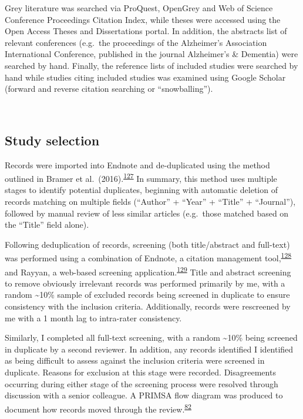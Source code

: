 \documentclass[a4paper, twoside]{templates/ociamthesis}
\begin{document}
Grey literature was searched via ProQuest, OpenGrey and Web of Science Conference Proceedings Citation Index, while theses were accessed using the Open Access Theses and Dissertations portal. In addition, the abstracts list of relevant conferences (e.g.~the proceedings of the Alzheimer's Association International Conference, published in the journal Alzheimer's \& Dementia) were searched by hand. Finally, the reference lists of included studies were searched by hand while studies citing included studies was examined using Google Scholar (forward and reverse citation searching or ``snowballing'').

~

\hypertarget{study-selection}{%
\subsection{Study selection}\label{study-selection}}

Records were imported into Endnote and de-duplicated using the method outlined in Bramer et al.~(2016).\textsuperscript{\protect\hyperlink{ref-bramer2016}{127}} In summary, this method uses multiple stages to identify potential duplicates, beginning with automatic deletion of records matching on multiple fields (``Author'' + ``Year'' + ``Title'' + ``Journal''), followed by manual review of less similar articles (e.g.~those matched based on the ``Title'' field alone).

Following deduplication of records, screening (both title/abstract and full-text) was performed using a combination of Endnote, a citation management tool,\textsuperscript{\protect\hyperlink{ref-hupe2019}{128}} and Rayyan, a web-based screening application.\textsuperscript{\protect\hyperlink{ref-ouzzani2016}{129}} Title and abstract screening to remove obviously irrelevant records was performed primarily by me, with a random \textasciitilde10\% sample of excluded records being screened in duplicate to ensure consistency with the inclusion criteria. Additionally, records were rescreened by me with a 1 month lag to intra-rater consistency.

Similarly, I completed all full-text screening, with a random \textasciitilde10\% being screened in duplicate by a second reviewer. In addition, any records identified I identified as being difficult to assess against the inclusion criteria were screened in duplicate. Reasons for exclusion at this stage were recorded. Disagreements occurring during either stage of the screening process were resolved through discussion with a senior colleague. A PRIMSA flow diagram was produced to document how records moved through the review.\textsuperscript{\protect\hyperlink{ref-page2021}{82}}
\end{document}
